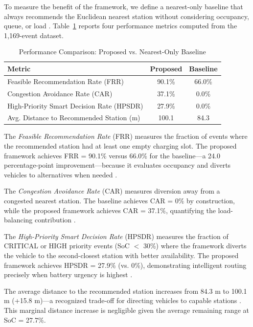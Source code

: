 \documentclass[conference]{IEEEtran}
\begin{document}
To measure the benefit of the framework, we define a nearest-only baseline that always recommends the Euclidean nearest station without considering occupancy, queue, or load \cite{b6}. Table~\ref{tab:comparison} reports four performance metrics computed from the 1,169-event dataset.

\begin{table}[htbp]
\caption{Performance Comparison: Proposed vs. Nearest-Only Baseline}
\label{tab:comparison}
\begin{center}
\begin{tabular}{|l|c|c|}
\hline
\textbf{Metric} & \textbf{Proposed} & \textbf{Baseline} \\
\hline
Feasible Recommendation Rate (FRR)       & 90.1\% & 66.0\% \\
\hline
Congestion Avoidance Rate (CAR)          & 37.1\% &  0.0\% \\
\hline
High-Priority Smart Decision Rate (HPSDR) & 27.9\% & 0.0\% \\
\hline
Avg. Distance to Recommended Station (m) & 100.1  & 84.3  \\
\hline
\end{tabular}
\end{center}
\end{table}

The \textit{Feasible Recommendation Rate} (FRR) measures the fraction of events where the recommended station had at least one empty charging slot. The proposed framework achieves FRR = 90.1\% versus 66.0\% for the baseline---a 24.0 percentage-point improvement---because it evaluates occupancy and diverts vehicles to alternatives when needed \cite{b12}.

The \textit{Congestion Avoidance Rate} (CAR) measures diversion away from a congested nearest station. The baseline achieves CAR = 0\% by construction, while the proposed framework achieves CAR = 37.1\%, quantifying the load-balancing contribution \cite{b7, b17}.

The \textit{High-Priority Smart Decision Rate} (HPSDR) measures the fraction of CRITICAL or HIGH priority events (SoC $<$ 30\%) where the framework diverts the vehicle to the second-closest station with better availability. The proposed framework achieves HPSDR = 27.9\% (vs. 0\%), demonstrating intelligent routing precisely when battery urgency is highest \cite{b9}.

The average distance to the recommended station increases from 84.3 m to 100.1 m (+15.8 m)---a recognized trade-off for directing vehicles to capable stations \cite{b5}. This marginal distance increase is negligible given the average remaining range at SoC = 27.7\%.
\end{document}
